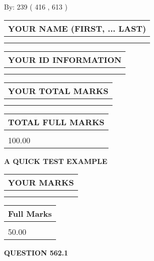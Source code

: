 \documentclass[12pt]{article}
\begin{document}
   
\hspace{1.0in} By: 
 239 ( 416 ,  613 )
   
   
   
   
\newpage 
\setcounter{page}{ 
   562001 } 
   
   
   
   
\noindent\begin{tabular}{|l|}
\hline
YOUR NAME (FIRST, ... LAST)  \\
\hline
 \\ 
 \\ 
\hline
\end{tabular}
\hspace{0.05in} \begin{tabular}{|l|}
\hline
 YOUR   ID   INFORMATION  \\
\hline
 \\ 
 \\ 
\hline
\end{tabular}
   
   
\vspace{0.2in}\noindent\begin{tabular}{|l|}
\hline
YOUR TOTAL MARKS  \\
\hline
 \\ 
 \\ 
\hline
\end{tabular}
\hspace{0.05in} \begin{tabular}{|l|}
\hline
TOTAL FULL MARKS  \\
\hline
 \\ 
100.00 \\
\hline
\end{tabular}
   
   
 \vspace{0.2in}
{\LARGE {\textbf{ A QUICK TEST EXAMPLE}}}
   
   
  
\vspace{0.2in}
  
\noindent\begin{tabular}{|l|}
\hline
 YOUR MARKS  \\
\hline
 \\ 
 \\ 
\hline
\end{tabular}
\hspace{0.05in} \begin{tabular}{|l|}
\hline
 Full Marks  \\
\hline
 \\ 
50.00 \\
\hline
\end{tabular}
{\textbf{\Large{QUESTION
562.1 
}}}
  
\end{document}
